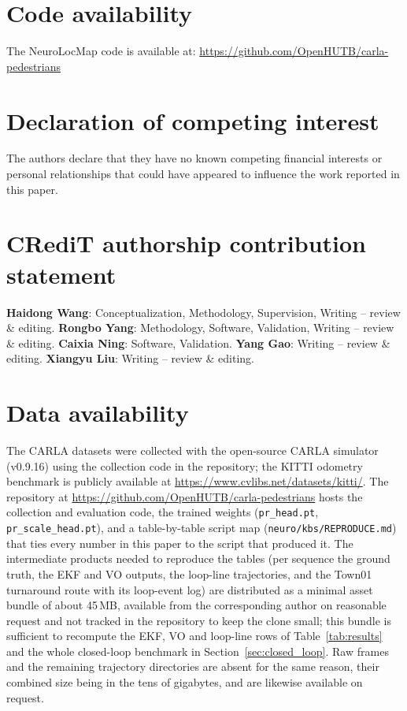 \documentclass[review,12pt]{elsarticle}
\begin{document}
\section*{Code availability}

The NeuroLocMap code is available at: \url{https://github.com/OpenHUTB/carla-pedestrians}

\section*{Declaration of competing interest}

The authors declare that they have no known competing financial interests or personal relationships that could have appeared to influence the work reported in this paper.

\section*{CRediT authorship contribution statement}

\textbf{Haidong Wang}: Conceptualization, Methodology, Supervision, Writing -- review \& editing. \textbf{Rongbo Yang}: Methodology, Software, Validation, Writing -- review \& editing. \textbf{Caixia Ning}: Software, Validation. \textbf{Yang Gao}: Writing -- review \& editing. \textbf{Xiangyu Liu}: Writing -- review \& editing.

\section*{Data availability}

The CARLA datasets were collected with the open-source CARLA simulator (v0.9.16) using the collection code in the repository; the KITTI odometry benchmark is publicly available at \url{https://www.cvlibs.net/datasets/kitti/}. The repository at \url{https://github.com/OpenHUTB/carla-pedestrians} hosts the collection and evaluation code, the trained weights (\texttt{pr\_head.pt}, \texttt{pr\_scale\_head.pt}), and a table-by-table script map (\texttt{neuro/kbs/REPRODUCE.md}) that ties every number in this paper to the script that produced it. The intermediate products needed to reproduce the tables (per sequence the ground truth, the EKF and VO outputs, the loop-line trajectories, and the Town01 turnaround route with its loop-event log) are distributed as a minimal asset bundle of about 45\,MB, available from the corresponding author on reasonable request and not tracked in the repository to keep the clone small; this bundle is sufficient to recompute the EKF, VO and loop-line rows of Table~\ref{tab:results} and the whole closed-loop benchmark in Section~\ref{sec:closed_loop}. Raw frames and the remaining trajectory directories are absent for the same reason, their combined size being in the tens of gigabytes, and are likewise available on request.



\end{document}
